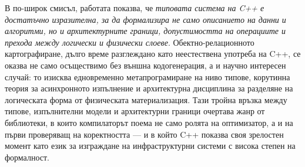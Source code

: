 В по-широк смисъл, работата показва, че \emph{типовата система на C++ е достатъчно изразителна, за да формализира не само описанието на данни и алгоритми, но и архитектурните граници, допустимостта на операциите и прехода между логически и физически слоеве}. Обектно-релационното картографиране, дълго време разглеждано като неестествена употреба на C++, се оказва не само осъществимо без външна кодогенерация, а и научно интересен случай: то изисква едновременно метапрограмиране на ниво типове, корутинна теория за асинхронното изпълнение и архитектурна дисциплина за разделяне на логическата форма от физическата материализация. Тази тройна връзка между типове, изпълнителни модели и архитектурни граници очертава жанр от библиотеки, в които компилаторът поема не само ролята на оптимизатор, а и на първи проверяващ на коректността --- и в който C++ показва своя зрелостен момент като език за изграждане на инфраструктурни системи с висока степен на формалност.

